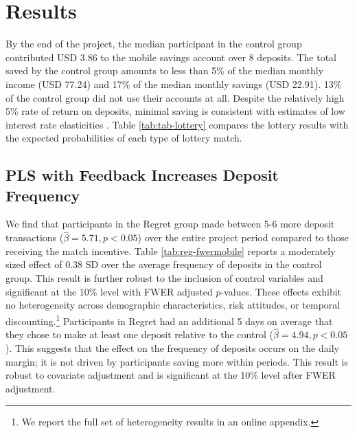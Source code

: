 \documentclass[11pt]{article}
\begin{document}
\section{Results} \label{sec:results}

	By the end of the project, the median participant in the control group contributed USD 3.86 to the mobile savings account over 8 deposits. The total saved by the control group amounts to less than 5\% of the median monthly income (USD 77.24) and 17\% of the median monthly savings (USD 22.91). 13\% of the control group did not use their accounts at all. Despite the relatively high 5\% rate of return on deposits, minimal saving is consistent with estimates of low interest rate elasticities \parencite{karlan_price_2018}. Table \ref{tab:tab-lottery} compares the lottery results with the expected probabilities of each type of lottery match.

	

	\subsection{PLS with Feedback Increases Deposit Frequency}

		We find that participants in the Regret group made between 5-6 more deposit transactions ($\hat \beta = 5.71, p < 0.05$) over the entire project period compared to those receiving the match incentive. Table \ref{tab:reg-fwermobile} reports a moderately sized effect of 0.38 SD over the average frequency of deposits in the control group. This result is further robust to the inclusion of control variables and significant at the 10\% level with FWER adjusted $p$-values. These effects exhibit no heterogeneity across demographic characteristics, risk attitudes, or temporal discounting.\footnote{We report the full set of heterogeneity results in an online appendix.} Participants in Regret had an additional 5 days on average that they chose to make at least one deposit relative to the control ($\hat \beta = 4.94, p < 0.05$). This suggests that the effect on the frequency of deposits occurs on the daily margin; it is not driven by participants saving more within periods. This result is robust to covariate adjustment and is significant at the 10\% level after FWER adjustment.
\end{document}
